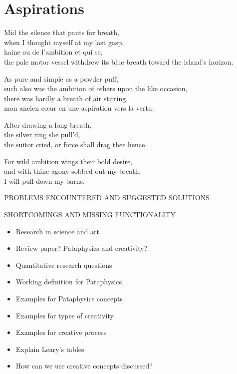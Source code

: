 
\chapter{Aspirations}
\label{ch:future}

\startcontents[chapters]

\vfill

Mid the silence that pants for breath, \\
when I thought myself at my last gasp, \\
haine ou de l'ambition et qui se, \\
the pale motor vessel withdrew its blue breath toward the island's horizon.

As pure and simple as a powder puff, \\
such also was the ambition of others upon the like occasion, \\
there was hardly a breath of air stirring, \\
mon ancien cœur en une aspiration vers la vertu.

After drawing a long breath, \\
the silver ring she pull'd, \\
the suitor cried, or force shall drag thee hence.

For wild ambition wings their bold desire, \\
and with thine agony sobbed out my breath, \\
I will pull down my barns.

\newpage
\minicontents
\spirals

PROBLEMS ENCOUNTERED AND SUGGESTED SOLUTIONS

SHORTCOMINGS AND MISSING FUNCTIONALITY

\begin{itemize}
  \item Research in science and art
  \item Review paper? Pataphysics and creativity?
  \item Quantitative research questions
  \item Working definition for Pataphysics
  \item Examples for Pataphysics concepts
  \item Examples for types of creativity
  \item Examples for creative process
  \item Explain Leary's tables
  \item How can we use creative concepts discussed?
\end{itemize}


